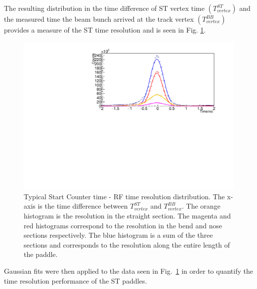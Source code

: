 The resulting distribution in the time difference of ST vertex time $(T^{ST}_{vertex})$ and the measured time the beam bunch arrived at the track vertex $(T^{BB}_{vertex})$ provides a measure of the ST time resolution and is seen in Fig. \ref{fig:st_time_res}.
	\begin{figure}[!htb]
		\centering
		\includegraphics[width=1.08\linewidth]{performance/figs/TR_15}
		\caption{Typical Start Counter time - RF time resolution distribution.  The x-axis is the time difference between $T^{ST}_{vertex}$ and $T^{BB}_{vertex}$. The orange histogram is the resolution in the straight section. The magenta and red histograms correspond to the resolution in the bend and nose sections respectively. The blue histogram is a sum of the three sections and corresponds to the resolution along the entire length of the paddle.}
		\label{fig:st_time_res}
	\end{figure}
Gaussian fits were then applied to the data seen in Fig.~\ref{fig:st_time_res} in order to quantify the time resolution performance of the ST paddles.

